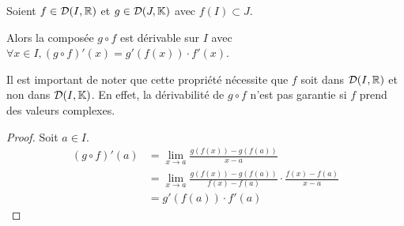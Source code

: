 \documentclass[12pt, a4paper]{report}
\begin{document}
\begin{property}
    Soient $f \in \mathcal{D}(I,\mathbb{R})$ et $g \in \mathcal{D}(J,\mathbb{K})$ avec $f(I) \subset J$.

    Alors la composée $g\circ f$ est dérivable sur $I$ avec $\forall x \in I, (g\circ f)'(x) = g'(f(x)) \cdot f'(x)$.

    \begin{attention}
        Il est important de noter que cette propriété nécessite que $f$ soit dans $\mathcal{D}(I,\mathbb{R})$ et non dans $\mathcal{D}(I,\mathbb{K})$. En effet, la dérivabilité de $g\circ f$ n'est pas garantie si $f$ prend des valeurs complexes.
    \end{attention}
\end{property}

\begin{proof}
    Soit $a \in I$.
    \begin{align*}
        (g\circ f)'(a) &= \lim_{x\to a} \frac{g(f(x)) - g(f(a))}{x-a} \\
            &= \lim_{x\to a} \frac{g(f(x)) - g(f(a))}{f(x) - f(a)} \cdot \frac{f(x) - f(a)}{x-a} \\
            &= g'(f(a)) \cdot f'(a)
    \end{align*}
\end{proof}
\end{document}
